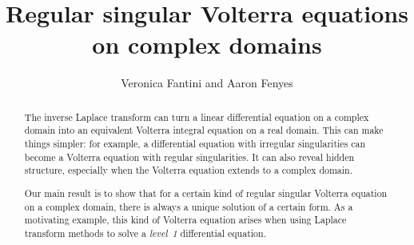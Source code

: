 \documentclass{article}
\title{Regular singular Volterra equations on complex domains}
\author{Veronica Fantini and Aaron Fenyes}
\date{}
\theoremstyle{plain}
\begin{document}
\maketitle

\begin{abstract}
The inverse Laplace transform can turn a linear differential equation on a complex domain into an equivalent Volterra integral equation on a real domain. This can make things simpler: for example, a differential equation with irregular singularities can become a Volterra equation with regular singularities. It can also reveal hidden structure, especially when the Volterra equation extends to a complex domain.

Our main result is to show that for a certain kind of regular singular Volterra equation on a complex domain, there is always a unique solution of a certain form. As a motivating example, this kind of Volterra equation arises when using Laplace transform methods to solve a {\em level~1} differential equation.
\end{abstract}

\tableofcontents
\end{document}

